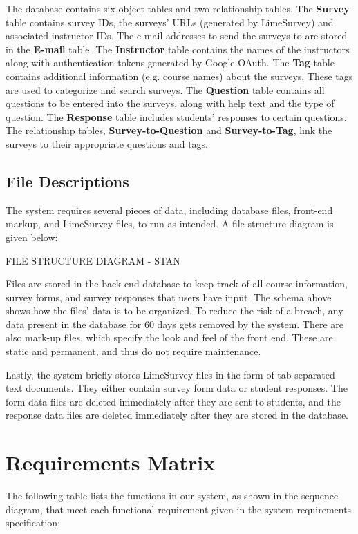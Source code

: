 \documentclass{article}
\begin{document}
The database contains six object tables and two relationship tables. The \textbf{Survey} table contains survey IDs, the surveys' URLs (generated by LimeSurvey) and associated instructor IDs. The e-mail addresses to send the surveys to are stored in the \textbf{E-mail} table. The \textbf{Instructor} table contains the names of the instructors along with authentication tokens generated by Google OAuth. The \textbf{Tag} table contains additional information (e.g. course names) about the surveys. These tags are used to categorize and search surveys. The \textbf{Question} table contains all questions to be entered into the surveys, along with help text and the type of question. The \textbf{Response} table includes students' responses to certain questions. The relationship tables, \textbf{Survey-to-Question} and \textbf{Survey-to-Tag}, link the surveys to their appropriate questions and tags.

\subsection{File Descriptions}

The system requires several pieces of data, including database files, front-end markup, and LimeSurvey files, to run as intended. A file structure diagram is given below:

FILE STRUCTURE DIAGRAM - STAN

Files are stored in the back-end database to keep track of all course information, survey forms, and survey responses that users have input. The schema above shows how the files' data is to be organized. To reduce the risk of a breach, any data present in the database for 60 days gets removed by the system. There are also mark-up files, which specify the look and feel of the front end. These are static and permanent, and thus do not require maintenance.

Lastly, the system briefly stores LimeSurvey files in the form of tab-separated text documents. They either contain survey form data or student responses. The form data files are deleted immediately after they are sent to students, and the response data files are deleted immediately after they are stored in the database.

\section{Requirements Matrix}

The following table lists the functions in our system, as shown in the sequence diagram, that meet each functional requirement given in the system requirements specification:
\end{document}
